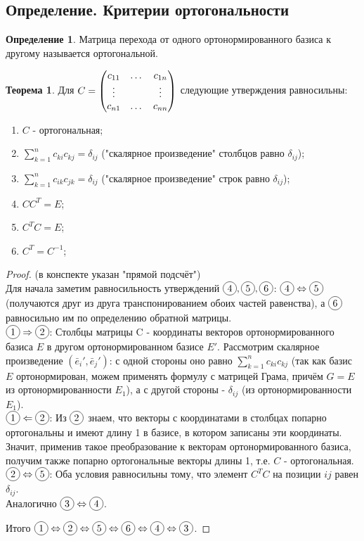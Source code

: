 \documentclass[a4paper, 12pt]{article}
\newcommand*\circled[1]{\tikz[baseline=(char.base)]{
            \node[shape=circle,draw,inner sep=2pt] (char) {#1};}}
\theoremstyle{definition}
\newtheorem*{definition}{Определение}
\newtheorem*{theorem}{Теорема}
\begin{document}
	\subsection{Определение. Критерии ортогональности}
	\begin{definition}
		Матрица перехода от одного ортонормированного базиса к другому называется ортогональной.
	\end{definition}
	\begin{theorem}
		Для $C = \begin{pmatrix} c_{11}&\dots&c_{1n} \\ \vdots&\null&\vdots \\ c_{n1}&\dots&c_{nn} \end{pmatrix}$ следующие утверждения равносильны:
		\begin{enumerate}
			\item $C$ - ортогональная;
			\item $\sum \limits_{k=1}^{n} c_{ki}c_{kj} = \delta_{ij}$ ("скалярное произведение" столбцов равно $\delta_{ij}$);
			\item $\sum \limits_{k=1}^{n} c_{ik}c_{jk} = \delta_{ij}$ ("скалярное произведение" строк равно $\delta_{ij}$);
			\item $C C^T = E$;
			\item $C^T C = E$;
			\item $C^T = C^{-1}$;
		\end{enumerate}
	\end{theorem}
	\begin{proof}(в конспекте указан "прямой подсчёт")\\
		Для начала заметим равносильность утверждений $\circled{4}, \circled{5}, \circled{6}$: $\circled{4} \Leftrightarrow \circled{5}$ (получаются друг из друга транспонированием обоих частей равенства), а $\circled{6}$ равносильно им по определению обратной матрицы.\\
		$\circled{1} \Rightarrow \circled{2}$: Столбцы матрицы C - координаты векторов ортонормированного базиса $E$ в другом ортонормированном базисе $E'$. Рассмотрим скалярное произведение $(\bar{e}_{i}', \bar{e}_{j}')$: с одной стороны оно равно $\sum \limits_{k=1}^{n} c_{ki}c_{kj}$ (так как базис $E$ ортонормирован, можем применять формулу с матрицей Грама, причём $G = E$ из ортонормированности $E_{1}$), а с другой стороны - $\delta_{ij}$ (из ортонормированности $E_{1}$).\\
		$\circled{1} \Leftarrow \circled{2}$: Из $\circled{2}$ знаем, что векторы с координатами в столбцах попарно ортогональны и имеют длину 1 в базисе, в котором записаны эти координаты. Значит, применив такое преобразование к векторам ортонормированного базиса, получим также попарно ортогональные векторы длины 1, т.е. $C$ - ортогональная.\\
		$\circled{2} \Leftrightarrow \circled{5}$: Оба условия равносильны тому, что элемент $C^T C$ на позиции $ij$ равен $\delta_{ij}$.\\
		Аналогично $\circled{3} \Leftrightarrow \circled{4}$.

		Итого $\circled{1} \Leftrightarrow \circled{2} \Leftrightarrow \circled{5} \Leftrightarrow \circled{6} \Leftrightarrow \circled{4} \Leftrightarrow \circled{3}$.
	\end{proof}
\end{document}
